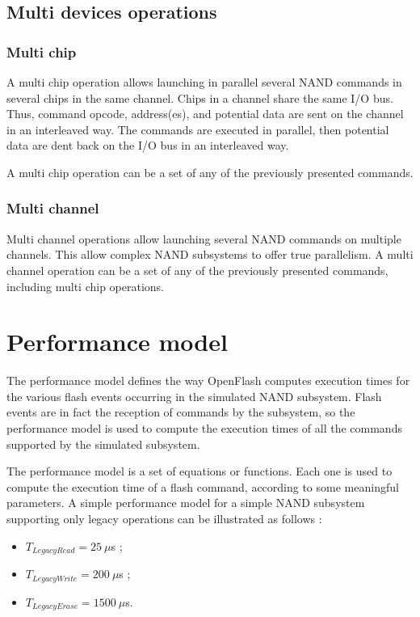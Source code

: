 \subsection{Multi devices operations}

\subsubsection{Multi chip}
A multi chip operation allows launching in parallel several NAND commands in several chips in the same channel. Chips in a channel share the same I/O bus. Thus, command opcode, address(es), and potential data are sent on the channel in an interleaved way. The commands are executed in parallel, then potential data are dent back on the I/O bus in an interleaved way.

A multi chip operation can be a set of any of the previously presented commands.
  
\subsubsection{Multi channel}
Multi channel operations allow launching several NAND commands on multiple channels. This allow complex NAND subsystems to offer true parallelism. A multi channel operation can be a set of any of the previously presented commands, including multi chip operations.

\section{Performance model}
The performance model defines the way OpenFlash computes execution times for the various flash events occurring in the simulated NAND subsystem. Flash events are in fact the reception of commands by the subsystem, so the performance model is used to compute the execution times of all the commands supported by the simulated subsystem.

The performance model is a set of equations or functions. Each one is used to compute the execution time of a flash command, according to some meaningful parameters. A simple performance model for a simple NAND subsystem supporting only legacy operations can be illustrated as follows :

\begin{itemize}
  \item $T_{LegacyRead} = 25~\mu$s ;
  \item $T_{LegacyWrite} = 200~\mu$s ;
  \item $T_{LegacyErase} = 1500~\mu$s.
\end{itemize}

